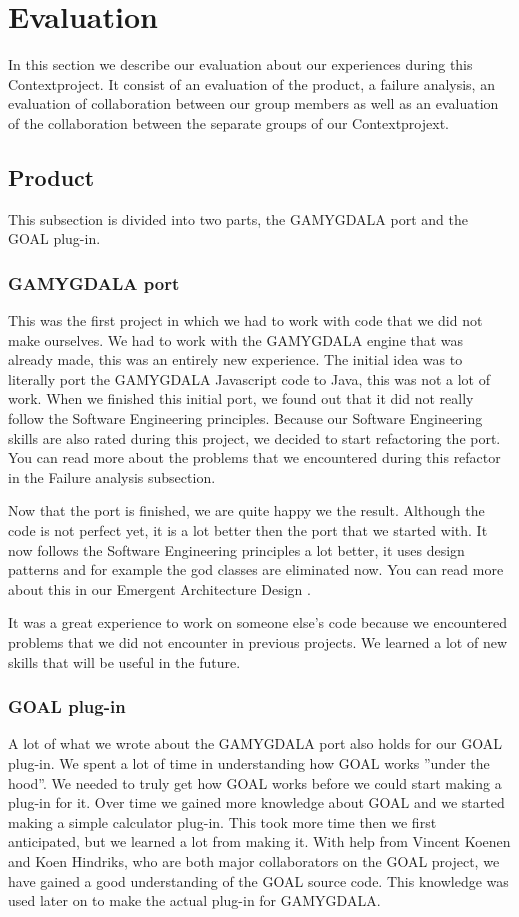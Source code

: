 \section{Evaluation}
In this section we describe our evaluation about our experiences during this Contextproject. It consist of an evaluation of the product, a failure analysis, an evaluation of collaboration between our group members as well as an evaluation of the collaboration between the separate groups of our Contextprojext.

\subsection{Product}
This subsection is divided into two parts, the GAMYGDALA port and the GOAL plug-in.

\subsubsection{GAMYGDALA port}
This was the first project in which we had to work with code that we did not make ourselves. We had to work with the GAMYGDALA engine that was already made, this was an entirely new experience. The initial idea was to literally port the GAMYGDALA Javascript code to Java, this was not a lot of work. When we finished this initial port, we found out that it did not really follow the Software Engineering principles. Because our Software Engineering skills are also rated during this project, we decided to start refactoring the port. You can read more about the problems that we encountered during this refactor in the Failure analysis subsection. \par
Now that the port is finished, we are quite happy we the result. Although the code is not perfect yet, it is a lot better then the port that we started with. It now follows the Software Engineering principles a lot better, it uses design patterns and for example the god classes are eliminated now. You can read more about this in our Emergent Architecture Design \citep{ead}. \par
It was a great experience to work on someone else's code because we encountered problems that we did not encounter in previous projects. We learned a lot of new skills that will be useful in the future.

\subsubsection{GOAL plug-in}
A lot of what we wrote about the GAMYGDALA port also holds for our GOAL plug-in. We spent a lot of time in understanding how GOAL works ''under the hood''. We needed to truly get how GOAL works before we could start making a plug-in for it. Over time we gained more knowledge about GOAL and we started making a simple calculator plug-in. This took more time then we first anticipated, but we learned a lot from making it. With help from Vincent Koenen and Koen Hindriks, who are both major collaborators on the GOAL project, we have gained a good understanding of the GOAL source code. This knowledge was used later on to make the actual plug-in for GAMYGDALA.

